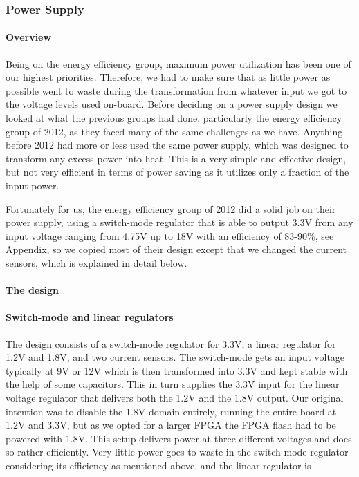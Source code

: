 \subsubsection{Power Supply}
\paragraph{Overview}
Being on the energy efficiency group, maximum power utilization has been one of
our highest priorities. Therefore, we had to make sure that as little power as
possible went to waste during the transformation from whatever input we got to
the voltage levels used on-board. Before deciding on a power supply design we
looked at what the previous groups had done, particularly the energy efficiency
group of 2012, as they faced many of the same challenges as we have. Anything
before 2012 had more or less used the same power supply, which was
designed to transform any excess power into heat. This is a very simple and
effective design, but not very efficient in terms of power saving as it utilizes
only a fraction of the input power.

Fortunately for us, the energy efficiency group of 2012 did a solid job on their
power supply, using a switch-mode regulator that is able to output 3.3V from
any input voltage ranging from 4.75V up to 18V with an efficiency of 83-90\%, see
Appendix, so we copied most of their design
except that we changed the current sensors, which is explained in detail below.

\paragraph{The design}
\paragraph{Switch-mode and linear regulators}
The design consists of a switch-mode regulator for 3.3V, a linear regulator for
1.2V and 1.8V, and two current sensors. The switch-mode gets
an input voltage typically at
9V or 12V which is then transformed into 3.3V and kept stable with the help of
some capacitors. This in turn supplies the 3.3V input for the linear voltage
regulator that delivers both the 1.2V and the 1.8V output. Our original
intention was to disable the 1.8V domain entirely, running the entire board at
1.2V and 3.3V, but as we opted for a larger FPGA the FPGA flash had to be
powered with 1.8V. This setup delivers power at three different voltages and
does so rather efficiently. Very little power goes to waste in the switch-mode
regulator considering its efficiency as mentioned above, and the linear
regulator is 

